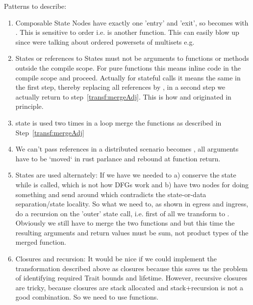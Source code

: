 Patterns to describe:
\begin{enumerate}
    \item\label{transf:mergeAdj} Composable State Nodes have exactly one 'entry' and 'exit', so  
    becomes  with . This is sensitive to order i.e.  is another function. This can easily blow up since were talking about ordered powersets of multisets e.g. 
    \item\label{transf:pullUp} States or references to States must not be arguments to functions or methods outside the compile scope. For pure functions this means inline code in the compile scope and proceed. Actually for stateful calls  it means the same in the first step, thereby replacing all  references by , in a second step we actually return to step~\ref{transf:mergeAdj}. This is how  and  originated in principle.
    \item state is used two times in a loop \means merge the functions as described in Step~\ref{transf:mergeAdj}
    \item\label{transf:remRefs} We can't pass references in a distributed scenario \means {} becomes  , all arguments have to be `moved` in rust parlance and rebound at function return. 
    \item States are used alternately: If we have  we needed to a) conserve the state  while  is called, which is not how DFGs work and b) have two nodes for  doing something and send  around which contradicts the state-or-data separation/state locality. So what we need to, as shown in egress and ingress, do a recursion on the 'outer' state call, i.e. first of all we transform to . Obviously we still have to merge the two functions  and  but this time the resulting arguments and return values must be sum, not product types of the merged function. 
    \item Closures and recursion: It would be nice if we could implement the transformation described above as closures because this saves us the problem of identifying required Trait bounds and lifetime. However, recursive closures are tricky, because closures are stack allocated and stack+recursion is not a good combination. So we need to use functions. 
    
\end{enumerate}



